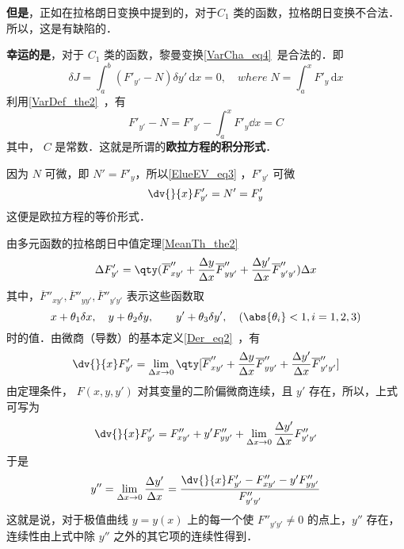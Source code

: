 \textbf{但是}，正如在拉格朗日变换中提到的，对于$C_1$ 类的函数，拉格朗日变换不合法．所以，这是有缺陷的．

\textbf{幸运的是}，对于 $C_1$ 类的函数，黎曼变换\autoref{VarCha_eq4}~是合法的．即
\begin{equation}
\delta J=\int_a^b \left(F'_{y'}-N \right) \delta y' \,\mathrm{d}{x}=0  ,\quad where \;N=\int_a^xF'_y \,\mathrm{d}{x} 
\end{equation}
利用\autoref{VarDef_the2}~，有
\begin{equation}\label{ElueEV_eq3}
F'_{y'}-N=F'_{y'}-\int_a^xF'_y\dd x=C
\end{equation}
其中， $C$ 是常数．这就是所谓的\textbf{欧拉方程的积分形式}．

因为 $N$ 可微，即 $N'=F'_y$，所以\autoref{ElueEV_eq3} ，$F'_{y'}$ 可微
\begin{equation}
\dv{}{x}F'_{y'}=N'=F'_y
\end{equation}
这便是欧拉方程的等价形式．

由多元函数的拉格朗日中值定理\autoref{MeanTh_the2}~
\begin{equation}
\Delta F'_{y'}=\qty(\overline{F}''_{xy'}+\frac{\Delta y}{\Delta x}\overline{F}''_{yy'}+\frac{\Delta y'}{\Delta x}\overline{F}''_{y'y'})\Delta x
\end{equation}
其中，$\overline{F}''_{xy'},\overline{F}''_{yy'},\overline{F}''_{y'y'}$ 表示这些函数取
\begin{equation}
x+\theta_1\delta x,\quad y+\theta_2\delta y,\quad \quad y'+\theta_3\delta y',\quad (\abs{\theta_i}<1,i=1,2,3)
\end{equation}
时的值．由微商（导数）的基本定义\autoref{Der_eq2}~，有
\begin{equation}
\dv{}{x}F'_{y'}=\lim_{\Delta x\rightarrow 0}\qty[\overline{F}''_{xy'}+\frac{\Delta y}{\Delta x}\overline{F}''_{yy'}+\frac{\Delta y'}{\Delta x}\overline{F}''_{y'y'}]
\end{equation}
由定理条件， $F(x,y,y')$ 对其变量的二阶偏微商连续，且 $y'$ 存在，所以，上式可写为
\begin{equation}
\dv{}{x}F'_{y'}=F''_{xy'}+y'F''_{yy'}+\lim_{\Delta x\rightarrow0}\frac{\Delta y'}{\Delta x}F''_{y'y'}
\end{equation}
于是
\begin{equation}
y''=\lim_{\Delta x\rightarrow0}\frac{\Delta y'}{\Delta x}=\frac{\dv{}{x}F'_{y'}-F''_{xy'}-y'F''_{yy'}}{F''_{y'y'}}
\end{equation}
这就是说，对于极值曲线 $y=y(x)$ 上的每一个使 $F''_{y'y'}\neq0$ 的点上，$y''$ 存在，连续性由上式中除 $y''$ 之外的其它项的连续性得到．